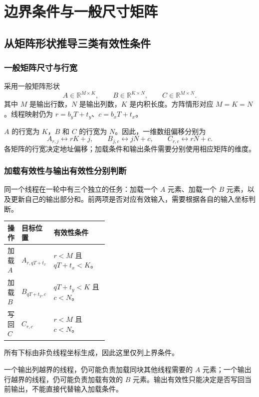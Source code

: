 \section{边界条件与一般尺寸矩阵}
\label{l6:sec:boundaries}

\subsection{从矩阵形状推导三类有效性条件}
\subsubsection{一般矩阵尺寸与行宽}
采用一般矩阵形状
\begin{equation}
 A\in\mathbb{R}^{M\times K},\qquad
 B\in\mathbb{R}^{K\times N},\qquad
 C\in\mathbb{R}^{M\times N}.
 \label{l6:eq:rect-shape}
\end{equation}
其中 $M$ 是输出行数，$N$ 是输出列数，$K$ 是内积长度。方阵情形对应 $M=K=N$。线程映射仍为 $r=b_yT+t_y$、$c=b_xT+t_x$。

$A$ 的行宽为 $K$，$B$ 和 $C$ 的行宽为 $N$。因此，一维数组偏移分别为
\[
 A_{r,j}\longleftrightarrow rK+j,\qquad
 B_{j,c}\longleftrightarrow jN+c,\qquad
 C_{r,c}\longleftrightarrow rN+c.
\]
各矩阵的行宽决定地址偏移；加载条件和输出条件需要分别使用相应矩阵的维度。

\subsubsection{加载有效性与输出有效性分别判断}
同一个线程在一轮中有三个独立的任务：加载一个 $A$ 元素、加载一个 $B$ 元素，以及更新自己的输出部分和。前两项是否对应有效输入，需要根据各自的输入坐标判断。
\begin{center}
\small
\begin{tabularx}{\linewidth}{@{}p{0.13\linewidth}p{0.27\linewidth}Y@{}}
\toprule
操作 & 目标位置 & 有效性条件 \\
\midrule
加载 $A$ & $A_{r,qT+t_x}$ & $r<M$ 且 $qT+t_x<K$。\\
加载 $B$ & $B_{qT+t_y,c}$ & $qT+t_y<K$ 且 $c<N$。\\
写回 $C$ & $C_{r,c}$ & $r<M$ 且 $c<N$。\\
\bottomrule
\end{tabularx}
\end{center}
所有下标由非负线程坐标生成，因此这里仅列上界条件。

一个输出列越界的线程，仍可能负责加载同块其他线程需要的 $A$ 元素；一个输出行越界的线程，仍可能负责加载有效的 $B$ 元素。输出有效性只能决定是否写回当前输出，不能直接代替输入加载条件。

